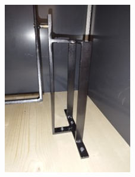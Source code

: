\begin{figure}[H]
    \centering
    \begin{subfigure}[b]{0.4\textwidth}
        \centering
        \includegraphics[width=\textwidth]{image/gyroskop1.jpeg}
        

\end{subfigure}
\end{figure}
